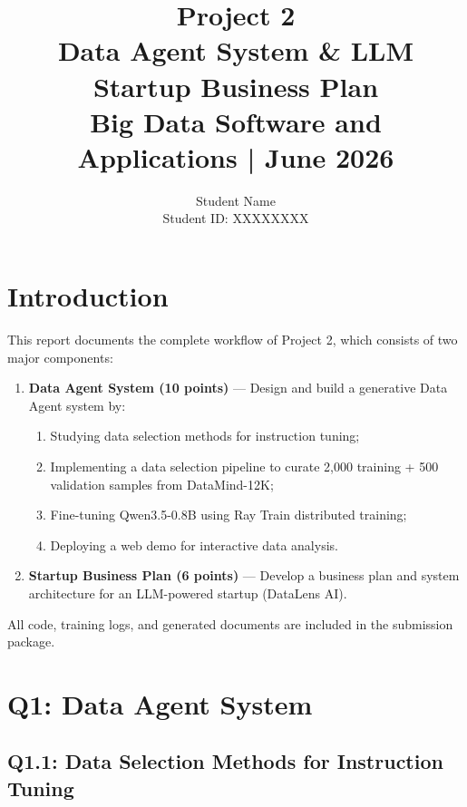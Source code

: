 \documentclass[12pt,a4paper]{article}
\title{
    \textbf{\huge Project 2}\\[0.3cm]
    \Large Data Agent System \& LLM Startup Business Plan\\[0.5cm]
    \normalsize Big Data Software and Applications \quad | \quad June 2026
}
\author{Student Name \\ Student ID: XXXXXXXX}
\date{}
\begin{document}
\maketitle
\thispagestyle{empty}

\newpage
\tableofcontents
\newpage

\section{Introduction}

This report documents the complete workflow of Project 2, which consists of two major components:

\begin{enumerate}[label=\textbf{Q\arabic*:}, leftmargin=*]
    \item \textbf{Data Agent System (10 points)} — Design and build a generative Data Agent system by:
    \begin{enumerate}
        \item Studying data selection methods for instruction tuning;
        \item Implementing a data selection pipeline to curate 2,000 training + 500 validation samples from DataMind-12K;
        \item Fine-tuning Qwen3.5-0.8B using Ray Train distributed training;
        \item Deploying a web demo for interactive data analysis.
    \end{enumerate}
    \item \textbf{Startup Business Plan (6 points)} — Develop a business plan and system architecture for an LLM-powered startup (DataLens AI).
\end{enumerate}

All code, training logs, and generated documents are included in the submission package.

\section{Q1: Data Agent System}

\subsection{Q1.1: Data Selection Methods for Instruction Tuning}
\end{document}
